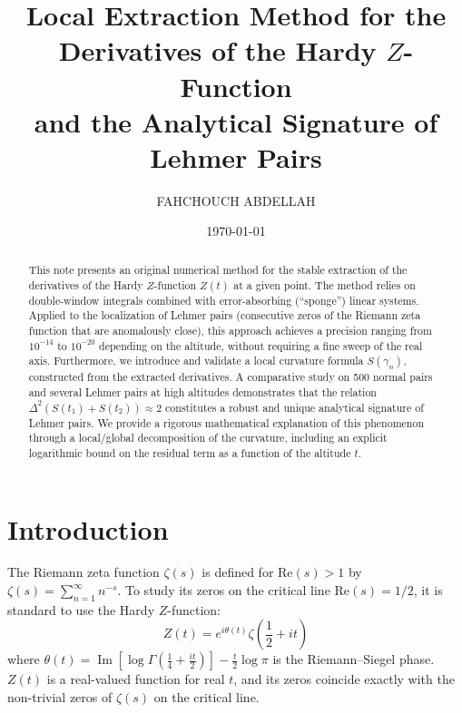 \documentclass[11pt, a4paper]{article}
\title{\textbf{\Large Local Extraction Method for the Derivatives of the Hardy $Z$-Function\\[10pt]
and the Analytical Signature of Lehmer Pairs}}
\author{FAHCHOUCH ABDELLAH}
\date{\today}
\begin{document}
\maketitle
\tableofcontents
\newpage  %

\begin{abstract}
This note presents an original numerical method for the stable extraction of the derivatives of the Hardy $Z$-function $Z(t)$ at a given point. The method relies on double-window integrals combined with error-absorbing (``sponge'') linear systems. Applied to the localization of Lehmer pairs (consecutive zeros of the Riemann zeta function that are anomalously close), this approach achieves a precision ranging from $10^{-14}$ to $10^{-20}$ depending on the altitude, without requiring a fine sweep of the real axis.
Furthermore, we introduce and validate a local curvature formula $S(\gamma_n)$, constructed from the extracted derivatives. A comparative study on 500 normal pairs and several Lehmer pairs at high altitudes demonstrates that the relation $\Delta^2(S(t_1) + S(t_2)) \approx 2$ constitutes a robust and unique analytical signature of Lehmer pairs. We provide a rigorous mathematical explanation of this phenomenon through a local/global decomposition of the curvature, including an explicit logarithmic bound on the residual term as a function of the altitude $t$.

\end{abstract}


\section{Introduction}
The Riemann zeta function $\zeta(s)$ is defined for $\text{Re}(s) > 1$ by $\zeta(s) = \sum_{n=1}^{\infty} n^{-s}$. To study its zeros on the critical line $\text{Re}(s) = 1/2$, it is standard to use the Hardy $Z$-function:
\begin{equation}
Z(t) = e^{i\theta(t)} \zeta\left(\frac{1}{2} + it\right)
\end{equation}
where $\theta(t) = \operatorname{Im}\left[\log\Gamma\left(\frac{1}{4} + \frac{it}{2}\right)\right] - \frac{t}{2}\log\pi$ is the Riemann--Siegel phase. $Z(t)$ is a real-valued function for real $t$, and its zeros coincide exactly with the non-trivial zeros of $\zeta(s)$ on the critical line.
\end{document}
